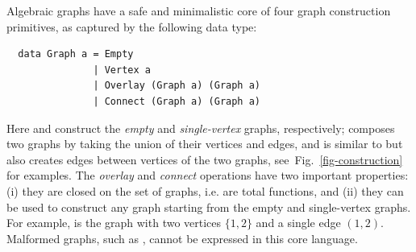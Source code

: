 Algebraic graphs have a safe and minimalistic core of four graph construction primitives,
as captured by the following data type:

\begin{verbatim}
  data Graph a = Empty
               | Vertex a
               | Overlay (Graph a) (Graph a)
               | Connect (Graph a) (Graph a)
\end{verbatim}

\noindent
Here  and  construct the \emph{empty} and \emph{single-vertex} graphs,
respectively;  composes two graphs by taking the union of their vertices and
edges, and  is similar to  but also creates edges between vertices
of the two graphs, see~Fig.~\ref{fig-construction} for examples. The \emph{overlay} and
\emph{connect} operations have two important properties:
(i) they are closed on the set of graphs, i.e. are total functions, and (ii) they can be used
to construct any graph starting from the empty and single-vertex graphs.
For example,  is the graph with two vertices $\{1,2\}$
and a single edge $(1,2)$. Malformed graphs, such as , cannot be
expressed in this core language.

